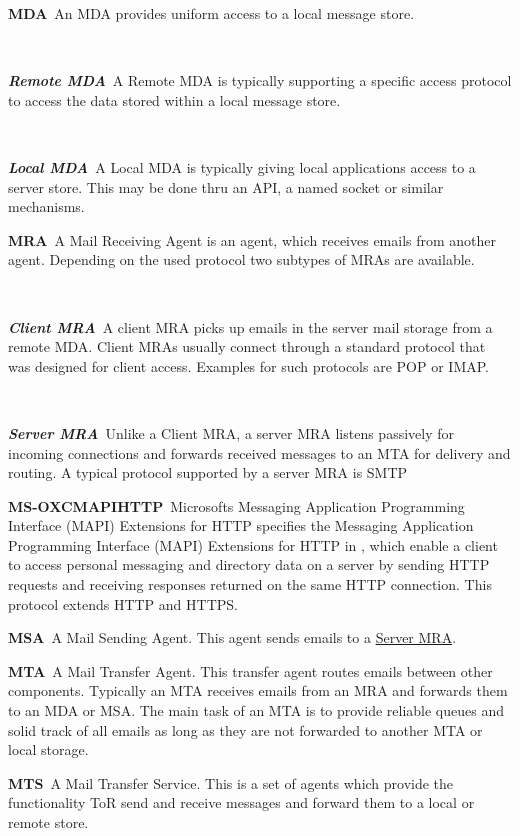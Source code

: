 \documentclass[a4paper,appendixprefix,pdfusetitle,twocolumn,fontsize=8pt,draft,DIV=calc,8pt]{\doctype} %
\newenvironment{entry}{\par\leavevmode\hangpara{1.5mm}{1}\ignorespaces}{\RaggedRight\par}
\newcommand*{\mainentry}[2]{{\bfseries{#1\label{def:#1}}}~#2\par}
\newcommand*{\subentry}[2]{\par~\begin{minipage}{\columnwidth-0.6cm}{\bfseries{\itshape{#1\label{def:#1}}}}~#2\end{minipage}}
\newcommand*{\defref}[1]{\hyperref[def:#1]{#1}}
\begin{document}
\begin{entry}
	\mainentry{MDA}{An MDA provides uniform access to a local message store.}
	\subentry{Remote MDA}{A Remote MDA is typically supporting a specific access protocol to access the data stored within a local message store.}
	\subentry{Local MDA}{A Local MDA is typically giving local applications access to a server store. This may be done thru an API, a named socket or similar mechanisms.}
\end{entry}

\begin{entry}
	\mainentry{MRA}{A Mail Receiving Agent is an agent, which receives emails from another agent. Depending on the used protocol two subtypes of MRAs are available.}
	\subentry{Client MRA}{A client MRA picks up emails in the server mail storage from a remote MDA. Client MRAs usually connect through a standard protocol that was designed for client access. Examples for such protocols are POP or IMAP.}
	\subentry{Server MRA}{Unlike a Client MRA, a server MRA listens passively for incoming connections and forwards received messages to an MTA for delivery and routing. A typical protocol supported by a server MRA is SMTP}
\end{entry}

\begin{entry}
	\mainentry{MS-OXCMAPIHTTP}{Microsofts Messaging Application Programming Interface (MAPI) 
		Extensions for HTTP specifies the Messaging Application Programming Interface (MAPI) Extensions for HTTP in \cite{ms-oxcmapihttp}, which enable a client to access personal messaging and directory data on a server by sending HTTP requests and receiving responses returned on the same HTTP connection. This protocol extends HTTP and HTTPS.}
\end{entry}

\begin{entry}
	\mainentry{MSA}{A Mail Sending Agent. This agent sends emails to a \defref{Server MRA}. }
\end{entry}

\begin{entry}
	\mainentry{MTA}{A Mail Transfer Agent. This transfer agent routes emails between other components. Typically an MTA receives emails from an MRA and forwards them to an MDA or MSA. The main task of an MTA is to provide reliable queues and solid track of all emails as long as they are not forwarded to another MTA or local storage.}
\end{entry}

\begin{entry}
	\mainentry{MTS}{A Mail Transfer Service. This is a set of agents which provide the functionality ToR send and receive messages and forward them to a local or remote store.}
\end{entry}
\end{document}

